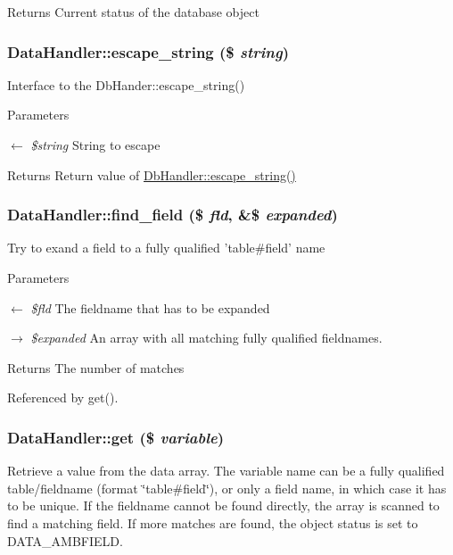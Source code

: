 \begin{DoxyReturn}{Returns}
Current status of the database object 
\end{DoxyReturn}
\subsubsection[{escape\_\-string}]{\setlength{\rightskip}{0pt plus 5cm}DataHandler::escape\_\-string (\$ {\em string})}\label{classDataHandler_a435338a167a44a041af2895859abb0c9}
Interface to the DbHander::escape\_\-string()


\begin{DoxyParams}{Parameters}
\item[\mbox{$\leftarrow$} {\em \$string}]String to escape \end{DoxyParams}
\begin{DoxyReturn}{Returns}
Return value of \hyperlink{classDbHandler_a67d77702ff6db70f89123d3f947af143}{DbHandler::escape\_\-string()} 
\end{DoxyReturn}
\subsubsection[{find\_\-field}]{\setlength{\rightskip}{0pt plus 5cm}DataHandler::find\_\-field (\$ {\em fld}, \/  \&\$ {\em expanded})}\label{classDataHandler_a1e4789e22370c96ae479bc3a58f30984}
Try to exand a field to a fully qualified 'table\#field' name


\begin{DoxyParams}{Parameters}
\item[\mbox{$\leftarrow$} {\em \$fld}]The fieldname that has to be expanded \item[\mbox{$\rightarrow$} {\em \$expanded}]An array with all matching fully qualified fieldnames. \end{DoxyParams}
\begin{DoxyReturn}{Returns}
The number of matches 
\end{DoxyReturn}


Referenced by get().

\subsubsection[{get}]{\setlength{\rightskip}{0pt plus 5cm}DataHandler::get (\$ {\em variable})}\label{classDataHandler_a7dcf85dac419f51ad4daa166c928a399}
Retrieve a value from the data array. The variable name can be a fully qualified table/fieldname (format \char`\"{}table\#field\char`\"{}), or only a field name, in which case it has to be unique. If the fieldname cannot be found directly, the array is scanned to find a matching field. If more matches are found, the object status is set to DATA\_\-AMBFIELD.


